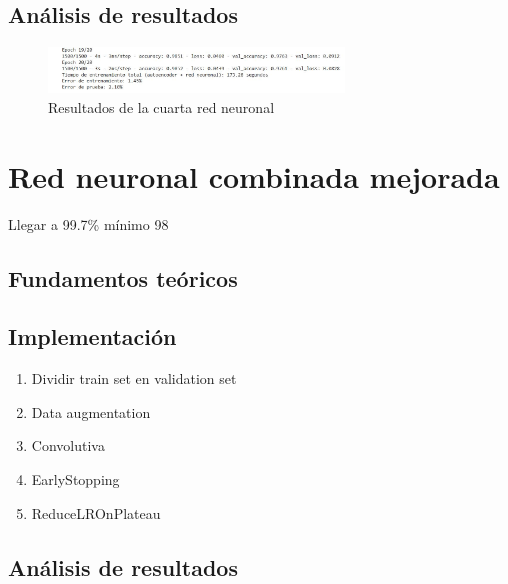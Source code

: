 \subsection{Análisis de resultados}

\begin{figure}[H]
	\centering
	\includegraphics[width=0.7\textwidth]{imgs/results-red4.JPG}
	\caption{Resultados de la cuarta red neuronal}
	\label{fig:results-red4}
\end{figure}



\section{Red neuronal combinada mejorada}

Llegar a 99.7\% mínimo 98

\subsection{Fundamentos teóricos}

\subsection{Implementación}

\begin{enumerate}
	\item Dividir train set en validation set
	\item Data augmentation
	\item Convolutiva
	\item EarlyStopping
	\item ReduceLROnPlateau
\end{enumerate}


\subsection{Análisis de resultados}


